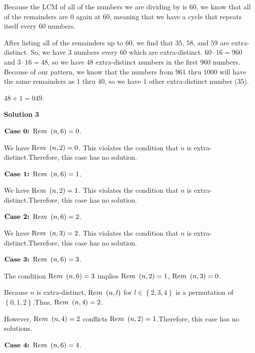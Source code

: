 \begin{enumerate}
{{Because the LCM of all of the numbers we are dividing by is $60$, we know that all of the remainders are $0$ again at $60$, meaning that we have a cycle that repeats itself every $60$ numbers.

 After listing all of the remainders up to $60$, we find that $35$, $58$, and $59$ are extra-distinct. So, we have $3$ numbers every $60$ which are extra-distinct. $60\cdot16 = 960$ and $3\cdot16 = 48$, so we have $48$ extra-distinct numbers in the first $960$ numbers. Because of our pattern, we know that the numbers from $961$ thru $1000$ will have the same remainders as $1$ thru $40$, so we have $1$ other extra-distinct number ($35$). 

 $48 + 1 =  \boxed{049}$.

 



\textbf{Solution 3}

$\textbf{Case 0:  } {\textrm Rem} \ \left( n, 6 \right) = 0$.

 We have ${\textrm Rem} \ \left( n, 2 \right) = 0$. This violates the condition that $n$ is extra-distinct.Therefore, this case has no solution.

 $\textbf{Case 1:  } {\textrm Rem} \ \left( n, 6 \right) = 1$.

 We have ${\textrm Rem} \ \left( n, 2 \right) = 1$. This violates the condition that $n$ is extra-distinct.Therefore, this case has no solution.

 $\textbf{Case 2:  } {\textrm Rem} \ \left( n, 6 \right) = 2$.

 We have ${\textrm Rem} \ \left( n, 3 \right) = 2$. This violates the condition that $n$ is extra-distinct.Therefore, this case has no solution.

 $\textbf{Case 3:  } {\textrm Rem} \ \left( n, 6 \right) = 3$.

 The condition ${\textrm Rem} \ \left( n, 6 \right) = 3$ implies ${\textrm Rem} \ \left( n, 2 \right) = 1$, ${\textrm Rem} \ \left( n, 3 \right) = 0$.

 Because $n$ is extra-distinct, ${\textrm Rem} \ \left( n, l \right)$ for $l \in \left\{ 2, 3, 4 \right\}$ is a permutation of $\left\{ 0, 1 ,2 \right\}$.Thus, ${\textrm Rem} \ \left( n, 4 \right) = 2$.

 However, ${\textrm Rem} \ \left( n, 4 \right) = 2$ conflicts ${\textrm Rem} \ \left( n, 2 \right) = 1$.Therefore, this case has no solutions.

 $\textbf{Case 4:  } {\textrm Rem} \ \left( n, 6 \right) = 4$.

}}
\end{enumerate}
